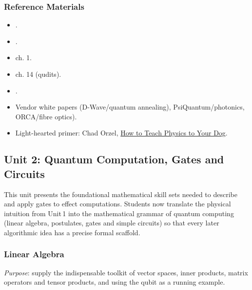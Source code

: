 \subsubsection{Reference Materials}
\begin{itemize}
	\item \citeauthor{Preskill:2023} .
	\item \citeauthor{Feynman:1986} .
	\item \citeauthor{Nielsen:2010}  ch. 1.
	\item \citeauthor{Lipton:2021}  ch. 14 (qudits).
	\item \citeauthor{Monroe:2021} .
	\item Vendor white papers (D-Wave/quantum annealing), PsiQuantum/photonics, ORCA/fibre optics).
	\item Light-hearted primer: Chad Orzel, \href{https://chadorzel.com/?cat=4}{How to Teach Physics to Your Dog}.
\end{itemize}

\subsection{Unit 2: Quantum Computation, Gates and Circuits}

This unit presents the foundational mathematical skill sets needed to describe and apply gates to effect computations. 
Students now translate the physical intuition from Unit\,1 into the mathematical grammar of quantum computing
(linear algebra, postulates, gates and simple circuits) so that every later algorithmic idea has a precise formal scaffold.

\subsubsection{Linear Algebra}

\emph{Purpose}: supply the indispensable toolkit of vector spaces, inner products, matrix operators and tensor products,
and using the qubit as a running example.

